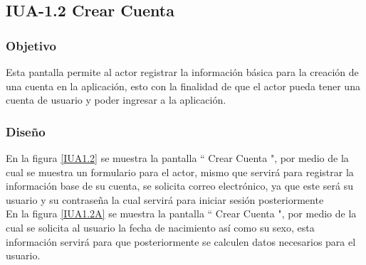 \subsection{IUA-1.2 Crear Cuenta}

\subsubsection{Objetivo}

	
 Esta pantalla permite al actor registrar la información básica para la creación de una cuenta en la aplicación, esto con la finalidad de que el actor pueda tener una cuenta de usuario y poder ingresar a la aplicación.

\subsubsection{Diseño}


    En la figura \ref{IUA1.2} se muestra la pantalla `` Crear Cuenta ", por medio de la cual se muestra un formulario para el actor, mismo que servirá para registrar la información base de su cuenta, se solicita correo electrónico, ya que este será su usuario y su contraseña la cual servirá para  iniciar sesión posteriormente\\
    
    En la figura \ref{IUA1.2A} se muestra la pantalla `` Crear Cuenta ", por medio de la cual se solicita al usuario la fecha de nacimiento así como su sexo, esta información servirá para que posteriormente se calculen datos necesarios para el usuario.

   

